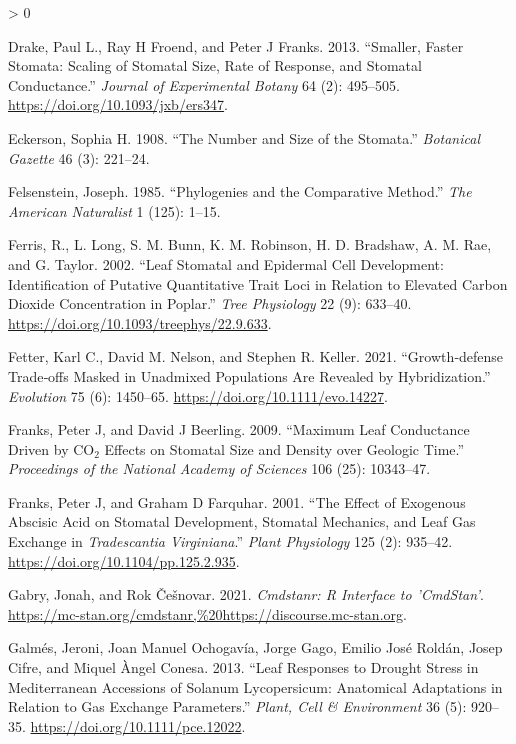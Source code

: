 \documentclass[
  10pt,
]{article}
\newlength{\cslhangindent}
\newenvironment{CSLReferences}[2] %
 {%
  \setlength{\parindent}{0pt}
  \ifodd #1 \everypar{\setlength{\hangindent}{\cslhangindent}}\ignorespaces\fi
  \ifnum #2 > 0
  \setlength{\parskip}{#2\baselineskip}
  \fi
 }%
 {}
\begin{document}
\begin{CSLReferences}{1}{0}
\leavevmode\hypertarget{ref-drake_smaller_2013}{}%
Drake, Paul L., Ray H Froend, and Peter J Franks. 2013. {``Smaller, Faster Stomata: Scaling of Stomatal Size, Rate of Response, and Stomatal Conductance.''} \emph{Journal of Experimental Botany} 64 (2): 495--505. \url{https://doi.org/10.1093/jxb/ers347}.

\leavevmode\hypertarget{ref-eckerson_number_1908}{}%
Eckerson, Sophia H. 1908. {``The Number and Size of the Stomata.''} \emph{Botanical Gazette} 46 (3): 221--24.

\leavevmode\hypertarget{ref-felsenstein_phylogenies_1985}{}%
Felsenstein, Joseph. 1985. {``Phylogenies and the Comparative Method.''} \emph{The American Naturalist} 1 (125): 1--15.

\leavevmode\hypertarget{ref-ferris_leaf_2002}{}%
Ferris, R., L. Long, S. M. Bunn, K. M. Robinson, H. D. Bradshaw, A. M. Rae, and G. Taylor. 2002. {``Leaf Stomatal and Epidermal Cell Development: Identification of Putative Quantitative Trait Loci in Relation to Elevated Carbon Dioxide Concentration in Poplar.''} \emph{Tree Physiology} 22 (9): 633--40. \url{https://doi.org/10.1093/treephys/22.9.633}.

\leavevmode\hypertarget{ref-fetter_growthdefense_2021}{}%
Fetter, Karl C., David M. Nelson, and Stephen R. Keller. 2021. {``Growth‐defense Trade‐offs Masked in Unadmixed Populations Are Revealed by Hybridization.''} \emph{Evolution} 75 (6): 1450--65. \url{https://doi.org/10.1111/evo.14227}.

\leavevmode\hypertarget{ref-franks_maximum_2009}{}%
Franks, Peter J, and David J Beerling. 2009. {``Maximum Leaf Conductance Driven by {CO}\(_{\textrm{2}}\) Effects on Stomatal Size and Density over Geologic Time.''} \emph{Proceedings of the National Academy of Sciences} 106 (25): 10343--47.

\leavevmode\hypertarget{ref-franks_effect_2001}{}%
Franks, Peter J, and Graham D Farquhar. 2001. {``The {Effect} of {Exogenous} {Abscisic} {Acid} on {Stomatal} {Development}, {Stomatal} {Mechanics}, and {Leaf} {Gas} {Exchange} in \emph{{Tradescantia} Virginiana}.''} \emph{Plant Physiology} 125 (2): 935--42. \url{https://doi.org/10.1104/pp.125.2.935}.

\leavevmode\hypertarget{ref-gabry_cmdstanr_2021}{}%
Gabry, Jonah, and Rok Češnovar. 2021. \emph{Cmdstanr: {R} {Interface} to '{CmdStan}'}. \url{https://mc-stan.org/cmdstanr,\%20https://discourse.mc-stan.org}.

\leavevmode\hypertarget{ref-galmes_leaf_2013}{}%
Galmés, Jeroni, Joan Manuel Ochogavía, Jorge Gago, Emilio José Roldán, Josep Cifre, and Miquel Àngel Conesa. 2013. {``Leaf Responses to Drought Stress in {Mediterranean} Accessions of {Solanum} Lycopersicum: Anatomical Adaptations in Relation to Gas Exchange Parameters.''} \emph{Plant, Cell \& Environment} 36 (5): 920--35. \url{https://doi.org/10.1111/pce.12022}.


\end{CSLReferences}
\end{document}
